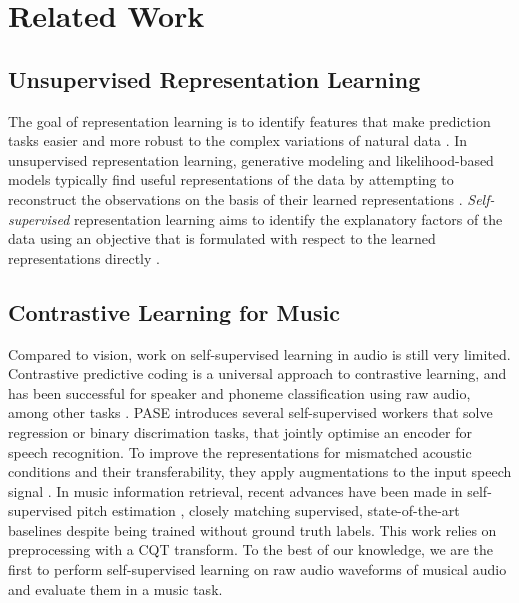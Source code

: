 \documentclass{article}
\begin{document}
\section{Related Work}
\label{sec:related}


\subsection{Unsupervised Representation Learning}
The goal of representation learning is to identify features that make  prediction tasks easier and more robust to the complex variations of natural data \cite{bengio2013representation}.
In unsupervised representation learning, generative modeling and likelihood-based models typically find useful representations of the data by attempting to reconstruct the observations on the basis of their learned representations \cite{goodfellow2014generative, unsupervised_gan}.
\emph{Self-supervised} representation learning aims to identify the explanatory factors of the data using an objective that is formulated with respect to the learned representations directly \cite{doersch_unsupervised_2015,zhang2016colorful,oord_representation_2019,henaff2019data,grill2020bootstrap}.

\subsection{Contrastive Learning for Music}
Compared to vision, work on self-supervised learning in audio is still very limited.
Contrastive predictive coding is a universal approach to contrastive learning, and has been successful for speaker and phoneme classification using raw audio, among other tasks \cite{oord_representation_2019}. PASE \cite{Pascual2019} introduces several self-supervised workers that solve regression or binary discrimation tasks, that jointly optimise an encoder for speech recognition. To improve the representations for mismatched acoustic conditions and their transferability, they apply augmentations to the input speech signal \cite{pase_plus}.
In music information retrieval, recent advances have been made in self-supervised pitch estimation \cite{spice}, closely matching supervised, state-of-the-art baselines \cite{crepe} despite being trained without ground truth labels.
This work relies on preprocessing with a CQT transform. To the best of our knowledge, we are the first to perform self-supervised learning on raw audio waveforms of musical audio and evaluate them in a music task.
\end{document}

